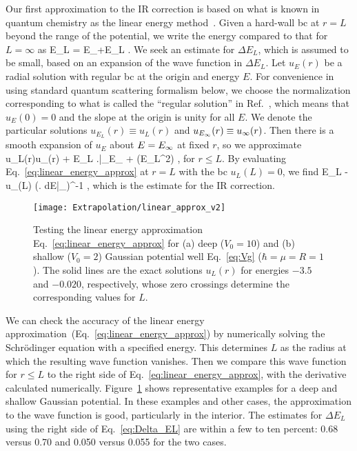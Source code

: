 	Our first approximation to the IR correction
	is based on what is known in quantum chemistry
	as the linear energy method~\cite{Djajaputra:2000aa}.  Given a
	hard-wall bc at $r=L$ beyond the range of the
	potential, we write the energy compared to that for $L=\infty$ as
	\beq
	 E_L = E_{\infty}+\Delta E_L
	 \;.
	\eeq
	We seek an estimate for $\Delta E_L$, which is assumed to be small,
	based on an expansion of the wave function in $\Delta E_L$.  Let
	$u_E(r)$ be a radial solution with regular bc at the
	origin and energy $E$.  For convenience in using standard quantum
	scattering formalism below, we choose the normalization corresponding
	to what is called the ``regular solution'' in
	Ref.~\cite{taylor2006scattering}, which means that $u_E(0) = 0$ and
	the slope at the origin is unity for all $E$.  We denote the
	particular solutions $u_{E_L}(r)\equiv u_L(r)$ and $u_{E_{\infty}}(r)
	\equiv u_\infty (r)$. Then there is a smooth expansion of $u_E$ about
	$E=E_{\infty}$ at fixed $r$, so we approximate~\cite{Djajaputra:2000aa}
	\beq
	  u_L(r)\approx u_\infty (r) + \Delta E_L
	  \left.\right|_{E_{\infty}}
	  + (\Delta E_L^2) \;,
	  \label{eq:linear_energy_approx}
	\eeq
	for $r\leq L$.
	By evaluating Eq.~\eqref{eq:linear_energy_approx} at $r=L$ with the
	bc $u_L(L)=0$, we find
	\beq
	  \Delta E_L \approx -u_\infty(L) \left(\left.
	  {dE}\right|_{\Einf}\right)^{-1}
	  \;,
	  \label{eq:Delta_EL}
	\eeq
	which is the estimate for the IR correction.

	\begin{figure}[h]
	\centering
	\texttt{[image: Extrapolation/linear\_approx\_v2]}
	\caption{Testing the linear energy approximation
	  Eq.~\eqref{eq:linear_energy_approx} for (a) deep ($V_0=10$) and (b)
	  shallow ($V_0=2$) Gaussian potential well Eq.~\eqref{eq:Vg}
		($\hbar = \mu = R=1$).
	  The solid lines are the exact solutions $u_L(r)$ for energies $-3.5$
	  and $-0.020$, respectively, whose zero crossings determine the
	  corresponding values for $L$.}
	\label{fig:linear_energy_approx}
	\end{figure}

	We can check the accuracy of the linear energy
	approximation~(Eq.~\eqref{eq:linear_energy_approx}) by numerically solving
	the Schr\"odinger equation with a specified energy.  This determines
	$L$ as the radius at which the resulting wave function vanishes. Then
	we compare this wave function for $r \leq L$ to the right side of
	Eq.~\eqref{eq:linear_energy_approx}, with the derivative calculated
	numerically.  Figure~\ref{fig:linear_energy_approx} shows
	representative examples for a deep and shallow Gaussian potential.  In
	these examples and other cases, the approximation to the wave function
	is good, particularly in the interior.  The estimates for $\Delta E_L$
	using the right side of Eq.~\eqref{eq:Delta_EL} are within a few to
	ten percent: 0.68 versus 0.70 and 0.050 versus 0.055 for the two
	cases.

